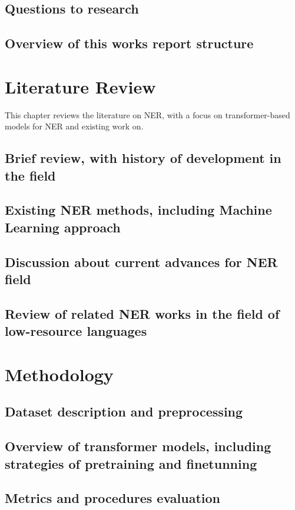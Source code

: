 \documentclass[a4paper,12pt]{report}
\begin{document}
\section{Questions to research}
\section{Overview of this works report structure}

\chapter{Literature Review}
This chapter reviews the literature on NER, with a focus on transformer-based models for NER and existing work on.
\section{Brief review, with history of development in the field}
\section{Existing NER methods, including Machine Learning approach}
\section{Discussion about current advances for NER field}
\section{Review of related NER works in the field of low-resource languages}


\chapter{Methodology}
\section{Dataset description and preprocessing}
\section{Overview of transformer models, including strategies of pretraining and finetunning}
\section{Metrics and procedures evaluation}
\end{document}
